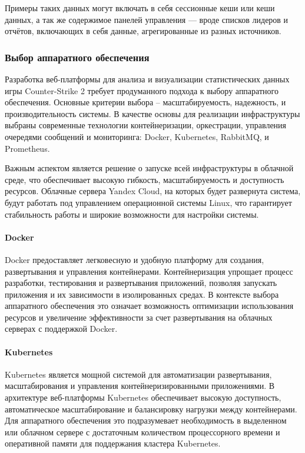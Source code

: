 Примеры таких данных могут включать в себя сессионные кеши или кеши данных, а так же содержимое панелей управления — вроде списков лидеров и отчётов, включающих в себя данные, агрегированные из разных источников.

\subsubsection{Выбор аппаратного обеспечения}

Разработка веб-платформы для анализа и визуализации статистических данных игры Counter-Strike 2 требует продуманного подхода к выбору аппаратного обеспечения. Основные критерии выбора – масштабируемость, надежность, и производительность системы. В качестве основы для реализации инфраструктуры выбраны современные технологии контейнеризации, оркестрации, управления очередями сообщений и мониторинга: Docker, Kubernetes, RabbitMQ, и Prometheus.

Важным аспектом является решение о запуске всей инфраструктуры в облачной среде, что обеспечивает высокую гибкость, масштабируемость и доступность ресурсов. Облачные сервера Yandex Cloud, на которых будет развернута система, будут работать под управлением операционной системы Linux, что гарантирует стабильность работы и широкие возможности для настройки системы.

\paragraph{Docker}

Docker предоставляет легковесную и удобную платформу для создания, развертывания и управления контейнерами. Контейнеризация упрощает процесс разработки, тестирования и развертывания приложений, позволяя запускать приложения и их зависимости в изолированных средах. В контексте выбора аппаратного обеспечения это означает возможность оптимизации использования ресурсов и увеличение эффективности за счет развертывания на облачных серверах с поддержкой Docker.

\paragraph{Kubernetes}

Kubernetes является мощной системой для автоматизации развертывания, масштабирования и управления контейнеризированными приложениями. В архитектуре веб-платформы Kubernetes обеспечивает высокую доступность, автоматическое масштабирование и балансировку нагрузки между контейнерами. Для аппаратного обеспечения это подразумевает необходимость в выделенном или облачном сервере с достаточным количеством процессорного времени и оперативной памяти для поддержания кластера Kubernetes.

